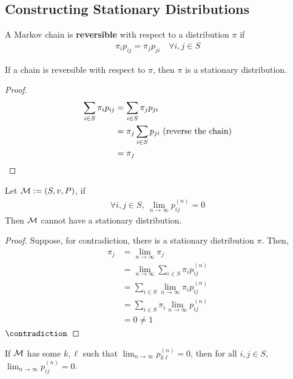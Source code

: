 \documentclass{article}
\newcommand{\upn}[0]{^{(n)}}
\begin{document}
    \subsection{Constructing Stationary Distributions}
    \begin{definition}
    	A Markov chain is \textbf{reversible} with respect to a distribution $\pi$ if 
	    \begin{align}
	    	\pi_i p_{ij} = \pi_j p_{ji}\quad \forall i, j \in S
	    \end{align}
	\end{definition}

	\begin{theorem}
		If a chain is reversible with respect to $\pi$, then $\pi$ is a stationary distribution.
	\end{theorem}
	
	\begin{proof}
		\begin{align}
			\sum_{i \in S} \pi_i p_{ij} &= \sum_{i \in S} \pi_j p_{ji} \\
			&= \pi_j \sum_{i \in S} p_{ji} \text{{ (reverse the chain)}}\\
			&= \pi_j
		\end{align}
	\end{proof}
	
	\begin{theorem}
		Let $\mathcal{{M}} := (S, v, P)$, if
		\begin{align}
			\forall i, j \in S,\ \lim_{n\to\infty} p_{ij}\upn = 0
		\end{align}
		Then $\mathcal{{M}}$ cannot have a stationary distribution.
	\end{theorem}
	
	\begin{proof}
		Suppose, for contradiction, there is a stationary distribution $\pi$. Then,
		\begin{align}
			\pi_j &= \lim_{n \to \infty} \pi_j \\
			&= \lim_{n \to \infty} \sum_{i \in S} \pi_i p_{ij}\upn \\
			&= \sum_{i \in S} \lim_{n \to \infty} \pi_i p_{ij}\upn \\
			&= \sum_{i \in S} \pi_i \lim_{n \to \infty} p_{ij}\upn \\
			&= 0 \neq 1
		\end{align}
		$\contradiction$
	\end{proof}
	
	\begin{lemma}
		If $\mathcal{{M}}$ has some $k, \ell$ such that $\lim_{n \to \infty} p_{k\ell}\upn = 0$, then for all $i, j \in S$, $\lim_{n \to \infty} p_{ij}\upn = 0$.
	\end{lemma}
	
\end{document}
